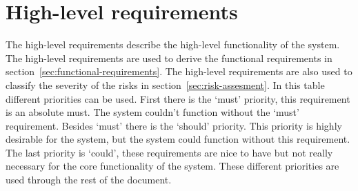 
\clearpage
\section{High-level requirements}

The high-level requirements describe the high-level functionality of the system. The high-level requirements are used to derive the functional requirements in section~\ref{sec:functional-requirements}. The high-level requirements are also used to classify the severity of the risks in section~\ref{sec:risk-assesment}. In this table different priorities can be used. First there is the `must' priority, this requirement is an absolute must. The system couldn't function without the `must' requirement. Besides `must' there is the `should' priority. This priority is highly desirable for the system, but the system could function without this requirement. The last priority is `could', these requirements are nice to have but not really necessary for the core functionality of the system. These different priorities are used through the rest of the document.

